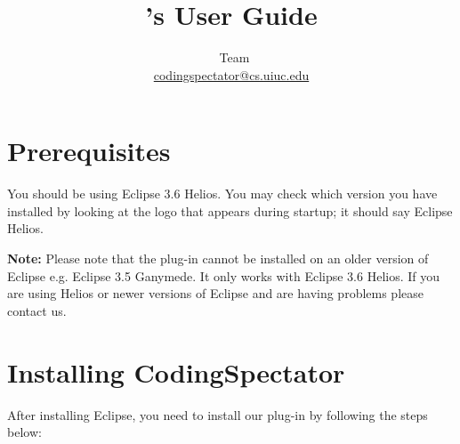 \documentclass{article}
\title{\codspec's User Guide}
\author{\codspec\
Team\\\href{mailto:codingspectator@cs.uiuc.edu}{codingspectator@cs.uiuc.edu}}
\newcommand\codspec{CodingSpectator}
\newcommand\warnnote[1]{\textbf{Note: }#1}
\begin{document}
%
\maketitle
%
\tableofcontents
%
\section{Prerequisites}
%
You should be using Eclipse 3.6 Helios. You may check which version you have
installed by looking at the logo that appears during startup; it should say
Eclipse Helios.

\warnnote{Please note that the plug-in cannot be installed on an older version
of Eclipse e.g. Eclipse 3.5 Ganymede. It only works with Eclipse 3.6 Helios. If
you are using Helios or newer versions of Eclipse and are having problems please
contact us.}
%
\section{Installing \codspec}

After installing Eclipse, you need to install our plug-in by following the steps
below:
\end{document}
